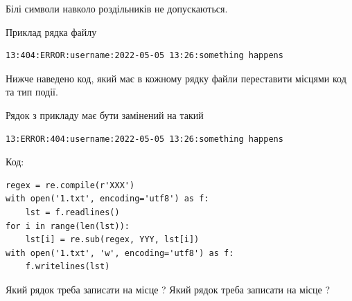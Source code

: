 \documentclass[12pt, ukrainian]{article}
\begin{document}
{Білі символи навколо роздільників не допускаються.

Приклад рядка файлу



\begin{verbatim}
13:404:ERROR:username:2022-05-05 13:26:something happens
\end{verbatim}


Нижче наведено код, який має в кожному рядку файли переставити місцями код та тип події.

Рядок з прикладу має бути замінений на такий



\begin{verbatim}
13:ERROR:404:username:2022-05-05 13:26:something happens
\end{verbatim}




Код:



\begin{verbatim}
regex = re.compile(r'XXX')
with open('1.txt', encoding='utf8') as f:
    lst = f.readlines()
for i in range(len(lst)):
    lst[i] = re.sub(regex, YYY, lst[i])
with open('1.txt', 'w', encoding='utf8') as f:
    f.writelines(lst)
\end{verbatim}





Який рядок треба записати на місце  ?
Який рядок треба записати на місце  ?\par

}
\end{document}

